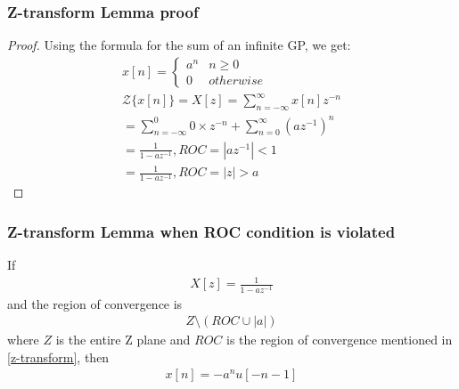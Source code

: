 \documentclass{beamer}
\providecommand{\abs}[1]{\left\vert#1\right\vert}
\begin{document}
\begin{frame}[fragile]
\frametitle{Z-transform Lemma proof}
\begin{flushleft}
\begin{proof}
Using the formula for the sum of an infinite GP, we get:
\begin{align}
    x[n] = 
    \begin{cases}
    a^n & n\geq 0\\
    0 & otherwise
    \end{cases}\\
    \mathcal{Z}\{x[n]\} = X[z] = \sum_{n = -\infty}^\infty x[n]z^{-n}\\
    = \sum_{n = -\infty}^0 0 \times z^{-n} + \sum_{n = 0}^{\infty} (az^{-1})^n\\
     = \frac{1}{1 - az^{-1}} , ROC = \abs{az^{-1}} < 1\\
      = \frac{1}{1 - az^{-1}} , ROC =  \abs{z} > a
\end{align}
\end{proof}
\end{flushleft}

\end{frame}


\begin{frame}[fragile]
\frametitle{Z-transform Lemma when ROC condition is violated}
\begin{flushleft}
\begin{lemma}
If 
\begin{align}
    X[z] = \frac{1}{1 - az^{-1}}
\end{align} and the region of convergence is
\begin{align}
    Z \setminus (ROC \cup \abs{a})
\end{align} where $Z$ is the entire Z plane and $ROC$ is the region of convergence mentioned in \eqref{z-transform}, then
\begin{align}
    x[n] = -a^nu[-n-1]
\end{align}
\label{ROC-violation}
\end{lemma}
\end{flushleft}
\end{frame}
\end{document}
